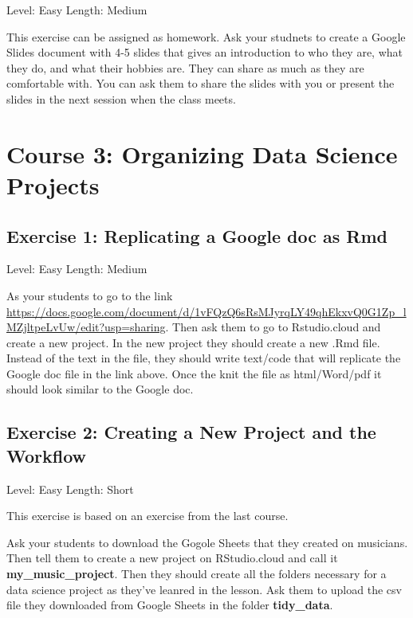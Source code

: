 \documentclass[]{book}
\begin{document}
Level: Easy
Length: Medium

This exercise can be assigned as homework. Ask your studnets to create a Google Slides document with 4-5 slides that gives an introduction to who they are, what they do, and what their hobbies are. They can share as much as they are comfortable with. You can ask them to share the slides with you or present the slides in the next session when the class meets.

\hypertarget{organizing}{%
\chapter*{Course 3: Organizing Data Science Projects}\label{organizing}}

\hypertarget{exercise-1-replicating-a-google-doc-as-rmd}{%
\section*{Exercise 1: Replicating a Google doc as Rmd}\label{exercise-1-replicating-a-google-doc-as-rmd}}

Level: Easy
Length: Medium

As your students to go to the link \url{https://docs.google.com/document/d/1vFQzQ6sRsMJyrqLY49qhEkxvQ0G1Zp_lMZjltpeLvUw/edit?usp=sharing}. Then ask them to go to Rstudio.cloud and create a new project. In the new project they should create a new .Rmd file. Instead of the text in the file, they should write text/code that will replicate the Google doc file in the link above. Once the knit the file as html/Word/pdf it should look similar to the Google doc.

\hypertarget{exercise-2-creating-a-new-project-and-the-workflow}{%
\section*{Exercise 2: Creating a New Project and the Workflow}\label{exercise-2-creating-a-new-project-and-the-workflow}}

Level: Easy
Length: Short

This exercise is based on an exercise from the last course.

Ask your students to download the Gogole Sheets that they created on musicians. Then tell them to create a new project on RStudio.cloud and call it \textbf{my\_music\_project}. Then they should create all the folders necessary for a data science project as they've leanred in the lesson. Ask them to upload the csv file they downloaded from Google Sheets in the folder \textbf{tidy\_data}.
\end{document}

